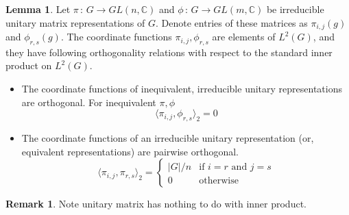 \documentclass{book}
\newcommand{\C}{\mathbb{C}}
\newcommand{\inner}[1]{\langle #1 \rangle}
\newcommand{\abs}[1]{\lvert #1 \rvert }
\theoremstyle{definition}
\newtheorem{lemma}{Lemma}[chapter]
\theoremstyle{remarkstyle}
\newtheorem*{remark}{Remark}%
\begin{document}
\begin{lemma}
    Let $\pi\,:\,G\rightarrow GL(n,\C)$ and $\phi\,:\,G\rightarrow GL(m,\C)$ be irreducible unitary matrix representations of $G$. Denote entries of these matrices as $\pi_{i,j}(g)$ and $ \phi_{r,s}(g) $. The coordinate functions $\pi_{i,j}, \phi_{r,s} $ are elements of $L^{2}(G) $, and they have following orthogonality relations with respect to the standard inner product on $L^{2}(G) $.
    \begin{itemize}
        \item The coordinate functions of inequivalent, irreducible unitary representations are orthogonal. For inequivalent $\pi, \phi$
        $$
        \inner{\pi_{i,j},\phi_{r,s}}_2 = 0
        $$
        \item The coordinate functions of an irreducible unitary representation (or, equivalent representations) are pairwise orthogonal. 
        $$
        \inner{\pi_{i,j},\pi_{r,s} }_2 = 
        \left\{ 
        \begin{array}{ll}
             \abs{G}/n & \textrm{if $i=r$ and $j=s$}  \\
             0 & \textrm{otherwise} 
        \end{array}
        \right.
        $$
    \end{itemize}
\end{lemma}
\begin{remark}
    Note unitary matrix has nothing to do with inner product.
\end{remark}
\end{document}
